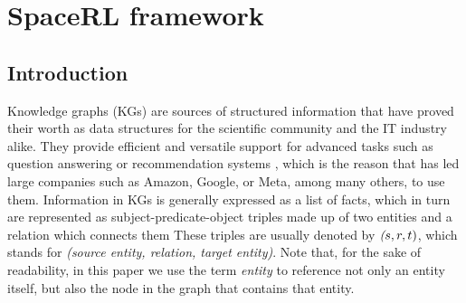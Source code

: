 \chapter{SpaceRL framework}\label{chap:framework}

\newcommand{\toolname}{SpaceRL}




\section{Introduction}\label{sec:framework-intro}

Knowledge graphs (KGs) are sources of structured information that have proved their worth as data structures for the scientific community 
and the IT industry alike.
They provide efficient and versatile support for advanced tasks such as question answering 
or recommendation systems 
, which is the reason that has led large companies such as Amazon, Google, or Meta, among many others, to use them. 
Information in KGs is generally expressed as a list of facts, which in turn are represented as subject-predicate-object triples made up of two entities and a relation which connects them 
 These triples are usually denoted by $\textit(s, r, t)$, which stands for \textit{(source entity, relation, target entity)}. Note that, for the sake of readability, in this paper we use the term \emph{entity} to reference not only an entity itself, but also the node in the graph that contains that entity. 

